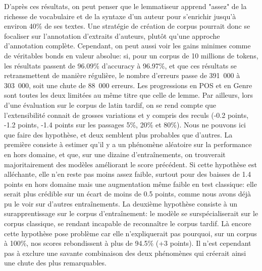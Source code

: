 D'après ces résultats, on peut penser que le lemmatiseur apprend "assez" de la richesse de vocabulaire et de la syntaxe d'un auteur pour s'enrichir jusqu'à environ 40\% de ses textes. Une stratégie de création de corpus pourrait donc se focaliser sur l'annotation d'extraits d'auteurs, plutôt qu'une approche d'annotation complète. Cependant, on peut aussi voir les gains minimes comme de véritables bonds en valeur absolue: si, pour un corpus de 10 millions de tokens, les résultats passent de 96.09\% d'accuracy à 96.97\%, et que ces résultats se retransmettent de manière régulière, le nombre d'erreurs passe de 391~000 à 303~000, soit une chute de 88~000 erreurs. Les progressions en POS et en Genre sont toutes les deux limitées au même titre que celle de lemme. Par ailleurs, lors d'une évaluation sur le corpus de latin tardif, on se rend compte que l'extensibilité connait de grosses variations et y compris des reculs (-0.2 points, -1.2 points, -1.4 points sur les passages 5\%, 20\% et 80\%). Nous ne pouvons ici que faire des hypothèse, et deux semblent plus probables que d'autres. La première consiste à estimer qu'il y a un phénomène aléatoire sur la performance en hors domaine, et que, sur une dizaine d'entraînements, on trouverait majoritairement des modèles améliorant le score précédent. Si cette hypothèse est alléchante, elle n'en reste pas moins assez faible, surtout pour des baisses de 1.4 points en hors domaine mais une augmentation même faible en test classique: elle serait plus crédible sur un écart de moins de 0.5 points, comme nous avons déjà pu le voir sur d'autres entraînements. La deuxième hypothèse consiste à un surapprentissage sur le corpus d'entraînement: le modèle se surspécialiserait sur le corpus classique, se rendant incapable de reconnaître le corpus tardif. Là encore cette hypothèse pose problème car elle n'expliquerait pas pourquoi, sur un corpus à 100\%, nos scores rebondissent à plus de 94.5\% (+3 points). Il n'est cependant pas à exclure une savante combinaison des deux phénomènes qui créerait ainsi une chute des plus remarquables.



